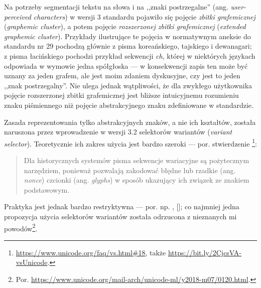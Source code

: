 


Na potrzeby segmentacji tekstu na słowa i na ,,znaki postrzegalne''
(ang. \textit{user-perceived characters}) w wersji 3 standardu
pojawiło się pojęcie \textit{zbitki grafemicznej} (\textit{graphemic
  cluster}), a potem pojęcie \textit{rozszerzonej zbitki grafemicznej}
(\textit{extended graphemic cluster}). Przykłady ilustrujące te
pojęcia w normatywnym aneksie do standardu nr 29 pochodzą głównie z
pisma koreańskiego, tajskiego i dewanagari; z pisma łacińskiego
pochodzi przykład sekwencji \textit{ch}, której w niektórych językach
odpowiada w wymowie jedna spółgłoska --- w konsekwencji zapis ten może
być uznany za jeden grafem, ale jest moim zdaniem dyskusyjne, czy jest
to jeden ,,znak postrzegalny''. Nie ulega jednak wątpliwości, że dla
zwykłego użytkownika pojęcie rozszerzonej zbitki grafemicznej jest
bliższe intuicyjnemu rozumieniu znaku piśmiennego niż pojęcie
abstrakcyjnego znaku zdefiniowane w standardzie.

Zasada reprezentowania tylko abstrakcyjnych znaków, a nie ich
kształtów, została naruszona przez wprowadzenie w wersji 3.2
selektorów wariantów (\textit{variant selector}). Teoretycznie ich
zakres użycia jest bardzo szeroki --- por. stwierdzenie
\footnote{\url{https://www.unicode.org/faq/vs.html\#18},
  także \url{https://bit.ly/2CjcsVA-vsUnicode}.}:
\begin{quote}
  Dla historycznych systemów pisma sekwencje wariacyjne są
  pożytecznym narzędziem, ponieważ pozwalają zakodować błędne lub
  rzadkie (ang. \textit{nonce}) czcionki (ang. \textit{glyphs}) w
  sposób ukazujący ich związek ze znakiem podstawowym.
\end{quote}
Praktyka jest jednak bardzo restryktywna ---
por. np. \cite{wiki:Vforms:2020}, [\cite{wiki:VS:2020}];
co najmniej jedna propozycja użycia selektorów wariantów została
odrzucona z nieznanych mi
powodów\footnote{Por.
  \url{https://www.unicode.org/mail-arch/unicode-ml/y2018-m07/0120.html}.}.





